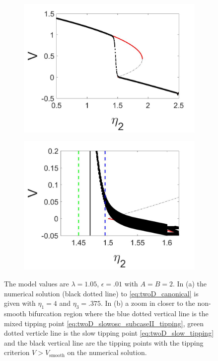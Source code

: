 \begin{figure}[H]
\centering
\begin{subfigure}{.5\textwidth}
 \centering
 \includegraphics[width=\linewidth]{twoD/slowosc_bif_diagram_medium.jpg}
 \caption{}
\end{subfigure}%
\begin{subfigure}{.5\textwidth}
 \centering
 \includegraphics[width=\linewidth]{twoD/slowosc_bif_diagram_medium_zoom.jpg}
 \caption{}
\end{subfigure}
\caption{The model values are $\lambda=1.05$, $\epsilon=.01$ with $A=B=2$. In (a) the numerical solution (black dotted line) to \eqref{eq:twoD_canonical} is given with $\eta_1=4$ and $\eta_3=.375$. In (b) a zoom in closer to the non-smooth bifurcation region where the blue dotted vertical line is the mixed tipping point \eqref{eq:twoD_slowosc_subcaseII_tipping}, green dotted verticle line is the slow tipping point \eqref{eq:twoD_slow_tipping} and the black vertical line are the tipping points with the tipping criterion $V>V_{\text{smooth}}$ on the numerical solution.}
\label{fig:twoD_slowosc_Vnumerics_medium}
\end{figure}


